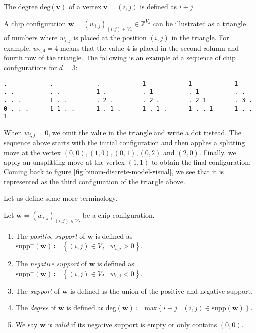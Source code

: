 \begin{definition}
    The degree \( \mathrm{deg}(\mathbf{v}) \) of a vertex \( \mathbf{v} = (i,j) \) is defined as \( i + j \).
\end{definition}

\begin{example}
    A chip configuration \( \mathbf{w} = (w_{i,j})_{(i,j) \in V_d} \in \mathbb{Z}^{V_d} \) can be illustrated as a triangle of numbers where \( w_{i,j} \) is placed at the position \( (i,j) \) in the triangle. For example, \( w_{2,4} = 4 \) means that the value \( 4 \) is placed in the second column and fourth row of the triangle. The following is an example of a sequence of chip configurations for \( d = 3 \):
    \begin{verbatim}
.            .            .            1            1            1
. .          . .          1 .          . 1          . 1          . .
. . .        1 . .        . 2 .        . 2 .        . 2 1        . 3 .
0 . . .     -1 1 . .     -1 . 1 .     -1 . 1 .     -1 . . 1     -1 . . 1
    \end{verbatim}
    When \( w_{i,j} = 0 \), we omit the value in the triangle and write a dot instead. The sequence above starts with the initial configuration and then applies a splitting move at the vertex \( (0,0), (1,0), (0,1), (0,2) \) and \( (2,0) \). Finally, we apply an unsplitting move at the vertex \( (1,1) \) to obtain the final configuration. Coming back to figure \ref{fig:binom-discrete-model-visual}, we see that it is represented as the third configuration of the triangle above.
\end{example}

Let us define some more terminology.

\begin{definition}\label{def:chip-terminology}
    Let \( \mathbf{w} = (w_{i,j})_{(i,j) \in V_d} \) be a chip configuration.
    \begin{enumerate}
        \item The \emph{positive support} of \( \mathbf{w} \) is defined as \( \mathrm{supp}^+(\mathbf{w}) \coloneqq \left\{ (i,j) \in V_d\mid w_{i,j} > 0 \right\} \).
        \item The \emph{negative support} of \( \mathbf{w} \) is defined as \( \mathrm{supp}^-(\mathbf{w}) \coloneqq \left\{ (i,j) \in V_d\mid w_{i,j} < 0 \right\} \).
        \item The \emph{support} of \( \mathbf{w} \) is defined as the union of the positive and negative support.
        \item The \emph{degree} of \( \mathbf{w} \) is defined as \( \mathrm{deg}(\mathbf{w}) \coloneqq \mathrm{max}\left\{ i+j \mid (i,j) \in \mathrm{supp}(\mathbf{w}) \right\} \).
        \item We say \( \mathbf{w} \) is \emph{valid} if its negative support is empty or only contains \( (0,0) \).
    \end{enumerate}
\end{definition}

